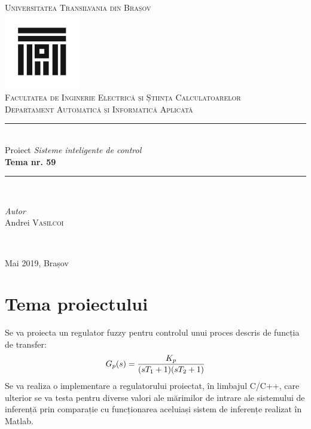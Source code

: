 \documentclass[11pt]{article}
\author{Andrei Vasilcoi}
\newcommand{\EqRow}{\vspace{1.5mm}}
\begin{document}
\begin{titlepage}

\newcommand{\HRule}{\rule{\linewidth}{0.5mm}}
	
\begin{center}
\textsc{\LARGE Universitatea Transilvania din Brașov}\\[0.5cm]
\includegraphics[width=0.25\textwidth]{logo_ut.jpg}\\[0.5cm]
\textsc{\Large Facultatea de Inginerie Electrică și Știința Calculatoarelor}\\[0.5cm]
\textsc{\large Departament Automatică și Informatică Aplicată}\\[1.5cm]
\HRule\\[0.5cm]
{\Large Proiect \textit{Sisteme inteligente de control}}\\[0.5cm]
{\LARGE\bfseries Tema nr. 59}\\[0.5cm]
\HRule\\[2.5cm]
\begin{minipage}{1\textwidth}
	\begin{flushleft}
		\large
		\textit{Autor}\\
		Andrei \textsc{Vasilcoi}\\
	\end{flushleft}
\end{minipage}
~
\end{center}
\centering
\vspace{5cm}
{\large Mai 2019, Brașov}\\[5cm]
\end{titlepage}

\newpage
{}
\tableofcontents

\newpage	
\section{Tema proiectului}
Se va proiecta un regulator fuzzy pentru controlul unui proces descris de funcția de transfer:
\EqRow
\begin{equation} 
G_p(s)=\frac{K_p}{(sT_{1}+1)(sT_{2}+1)}
\EqRow
\end{equation}
Se va realiza o implementare a regulatorului proiectat, în limbajul C/C++, care ulterior se va testa pentru diverse valori ale mărimilor de intrare ale sistemului de inferență prin comparație cu funcționarea aceluiași sistem de inferențe realizat în Matlab.
\end{document}
